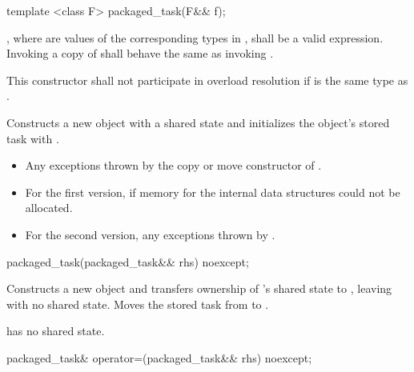 %
\begin{itemdecl}
template <class F>
  packaged_task(F&& f);
\end{itemdecl}

\begin{itemdescr}
\pnum
\requires
{}, where  are values
of the corresponding types in , shall be a valid expression. Invoking
a copy of  shall behave the same as invoking .

\pnum
\remarks
This constructor shall not participate in overload resolution if 
is the same type as .

\pnum
\effects Constructs a new  object with a shared state and
initializes the object's stored task with .

\pnum
\throws
\begin{itemize}
\item Any exceptions thrown by the copy or move constructor of .
\item For the first version,
    if memory for the internal data structures could not be allocated.
\item For the second version,
   any exceptions thrown by 
   .
\end{itemize}
\end{itemdescr}

%
\begin{itemdecl}
packaged_task(packaged_task&& rhs) noexcept;
\end{itemdecl}

\begin{itemdescr}
\pnum
\effects Constructs a new  object and transfers ownership of
's shared state to , leaving  with no
shared state. Moves the stored task from  to .

\pnum
\postconditions {} has no shared state.
\end{itemdescr}

%
\begin{itemdecl}
packaged_task& operator=(packaged_task&& rhs) noexcept;
\end{itemdecl}

